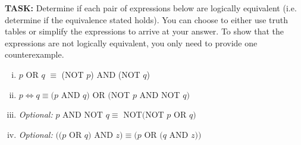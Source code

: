 \documentclass[12pt,letterpaper]{article}
\begin{document}
	\textbf{TASK:} Determine if each pair of expressions below are logically equivalent (i.e. determine if the equivalence stated holds). You can choose to either use truth tables or simplify the expressions to arrive at your answer. To show that the expressions are not logically equivalent, you only need to provide one counterexample.
		
		\begin{enumerate}[i.]
			\item $p$ OR $q$ $\equiv$ (NOT $p$) AND (NOT $q$)
			
			\begin{mdframed} \vspace{2.5cm} \end{mdframed}

			\item $p \Leftrightarrow q \equiv (p $ AND $ q) $ OR $ ($NOT $ p $ AND $ $NOT $ q)$
			
			\begin{mdframed} \vspace{2.5cm} \end{mdframed}
			
			\item \textit{Optional:} $p $ AND $ $NOT $ q \equiv $ NOT$ ($NOT $ p $ OR $ q)$
			
			\begin{mdframed} \vspace{2.5cm} \end{mdframed}
			
			\item \textit{Optional:} $((p $ OR $ q) $ AND $ z) \equiv (p $ OR $ (q $ AND $ z))$ 
			
			\begin{mdframed} \vspace{2.5cm} \end{mdframed}
			
	\end{enumerate}
	
\end{document}
